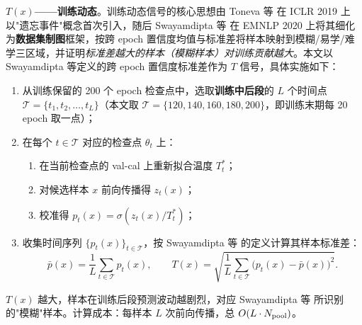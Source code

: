 \documentclass[UTF8,openany,12pt]{ctexbook}
\begin{document}
\textbf{$T(x)$——训练动态}。训练动态信号的核心思想由 Toneva 等\cite{toneva2019empirical} 在 ICLR 2019 上以"遗忘事件"概念首次引入，随后 Swayamdipta 等\cite{swayamdipta2020cartography} 在 EMNLP 2020 上将其细化为\textbf{数据集制图}框架，按跨 epoch 置信度均值与标准差将样本映射到模糊/易学/难学三区域，并证明\emph{标准差越大的样本（模糊样本）对训练贡献越大}。本文以 Swayamdipta 等定义的跨 epoch 置信度标准差作为 $T$ 信号，具体实施如下：
\begin{enumerate}[leftmargin=2em,nosep]
\item 从训练保留的 200 个 epoch 检查点中，选取\textbf{训练中后段}的 $L$ 个时间点 $\mathcal{T} = \{t_1, t_2, \ldots, t_L\}$（本文取 $\mathcal{T} = \{120, 140, 160, 180, 200\}$，即训练末期每 20 epoch 取一点）；
\item 在每个 $t \in \mathcal{T}$ 对应的检查点 $\theta_t$ 上：
  \begin{enumerate}[leftmargin=2em,nosep]
  \item[(a)] 在当前检查点的 val-cal 上重新拟合温度 $T_t^{\ast}$；
  \item[(b)] 对候选样本 $x$ 前向传播得 $z_t(x)$；
  \item[(c)] 校准得 $p_t(x) = \sigma(z_t(x)/T_t^{\ast})$；
  \end{enumerate}
\item 收集时间序列 $\{p_t(x)\}_{t \in \mathcal{T}}$，按 Swayamdipta 等\cite{swayamdipta2020cartography} 的定义计算其样本标准差：
\begin{equation}
\bar{p}(x) = \frac{1}{L}\sum_{t \in \mathcal{T}} p_t(x), \qquad
T(x) = \sqrt{\frac{1}{L}\sum_{t \in \mathcal{T}}\bigl(p_t(x) - \bar{p}(x)\bigr)^2}.
\label{eq:T-implement}
\end{equation}
\end{enumerate}
$T(x)$ 越大，样本在训练后段预测波动越剧烈，对应 Swayamdipta 等\cite{swayamdipta2020cartography} 所识别的"模糊"样本。计算成本：每样本 $L$ 次前向传播，总 $O(L \cdot N_{\rm pool})$。
\end{document}

